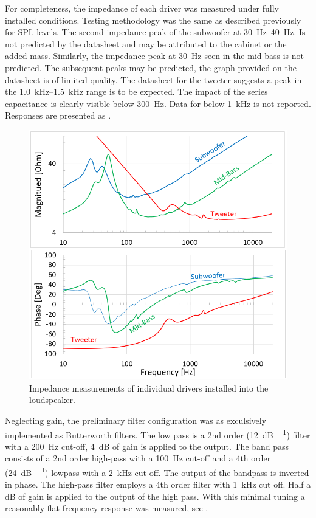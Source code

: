 For completeness, the impedance of each driver was measured under fully installed conditions. Testing methodology was the same as described previously for SPL levels. The second impedance peak of the subwoofer at \SIrange{30}{40}{\hertz}. Is not predicted by the datasheet and may be attributed to the cabinet or the added mass. Similarly, the impedance peak at \SI{30}{\hertz} seen in the mid-bass is not predicted. The subsequent peaks may be predicted, the graph provided on the datasheet is of limited quality. The datasheet for the tweeter suggests a peak in the \SIrange{1.0}{1.5}{\kilo\hertz} range is to be expected. The impact of the series capacitance is clearly visible below \SI{300}{\hertz}. Data for below \SI{1}{\kilo\hertz} is not reported. Responses are presented as .\par
%
\begin{figure}[h!]
\centering
\includegraphics[height = 3.5 in]{Images/sp_dats_impedance_response.png}
\caption{Impedance measurements of individual drivers installed into the loudspeaker.}
\label{fig:sp_impedance}
\end{figure}
%
Neglecting gain, the preliminary filter configuration was as exculsively implemented as Butterworth filters. The low pass is a 2nd order (\SI{12}{\dB\per\oct}) filter with a \SI{200}{\hertz} cut-off, \SI{4}{\dB} of gain is applied to the output. The band pass consists of a 2nd order high-pass with a \SI{100}{\hertz} cut-off and a 4th order (\SI{24}{\dB\per\oct}) lowpass with a \SI{2}{\kilo\hertz} cut-off. The output of the bandpass is inverted in phase. The high-pass filter employs a 4th order filter with \SI{1}{\kilo\hertz} cut off. Half a \si{\dB} of gain is applied to the output of the high pass. With this minimal tuning a reasonably flat frequency response was measured, see .\par
